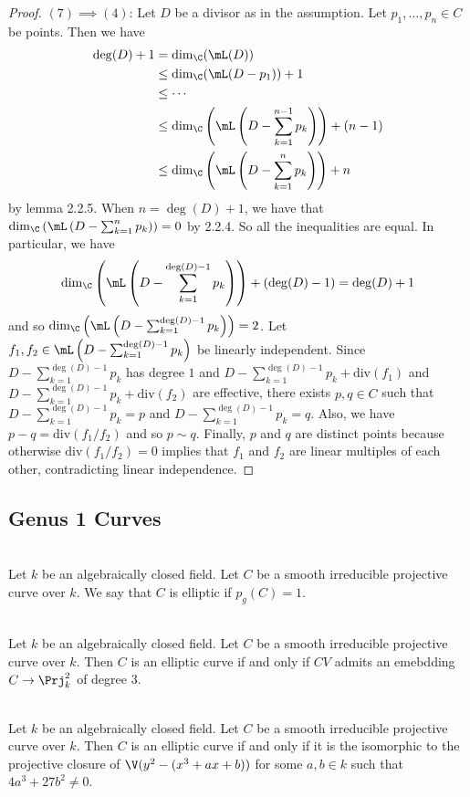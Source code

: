 \documentclass[a4paper]{article}
\begin{document}
\begin{prp}{}{}
\begin{proof}
$(7)\implies(4)$: Let $D$ be a divisor as in the assumption. Let $p_1,\dots,p_n\in C$ be points. Then we have 
\begin{align*}
\deg(D)+1&=\dim_\C(\mL(D))\\
&\leq\dim_\C(\mL(D-p_1))+1\\
&\leq\cdots\\
&\leq\dim_\C\left(\mL\left(D-\sum_{k=1}^{n-1}p_k\right)\right)+(n-1)\\
&\leq\dim_\C\left(\mL\left(D-\sum_{k=1}^np_k\right)\right)+n
\end{align*} by lemma 2.2.5. When $n=\deg(D)+1$, we have that $\dim_\C\left(\mL\left(D-\sum_{k=1}^np_k\right)\right)=0$ by 2.2.4. So all the inequalities are equal. In particular, we have $$\dim_\C\left(\mL\left(D-\sum_{k=1}^{\deg(D)-1}p_k\right)\right)+(\deg(D)-1)=\deg(D)+1$$ and so $\dim_\C\left(\mL\left(D-\sum_{k=1}^{\deg(D)-1}p_k\right)\right)=2$. Let $f_1,f_2\in\mL\left(D-\sum_{k=1}^{\deg(D)-1}p_k\right)$ be linearly independent. Since $D-\sum_{k=1}^{\deg(D)-1}p_k$ has degree $1$ and $D-\sum_{k=1}^{\deg(D)-1}p_k+\text{div}(f_1)$ and $D-\sum_{k=1}^{\deg(D)-1}p_k+\text{div}(f_2)$ are effective, there exists $p,q\in C$ such that $D-\sum_{k=1}^{\deg(D)-1}p_k=p$ and $D-\sum_{k=1}^{\deg(D)-1}p_k=q$. Also, we have $p-q=\text{div}(f_1/f_2)$ and so $p\sim q$. Finally, $p$ and $q$ are distinct points because otherwise $\text{div}(f_1/f_2)=0$ implies that $f_1$ and $f_2$ are linear multiples of each other, contradicting linear independence. 
\end{proof}
\end{prp}

\subsection{Genus 1 Curves}
\begin{defn}{}{}\\
Let $k$ be an algebraically closed field. Let $C$ be a smooth irreducible projective curve over $k$. We say that $C$ is elliptic if $p_g(C)=1$. 
\end{defn}

\begin{prp}{}{}\\
Let $k$ be an algebraically closed field. Let $C$ be a smooth irreducible projective curve over $k$. Then $C$ is an elliptic curve if and only if $CV$ admits an emebdding $C\to\Prj_k^2$ of degree $3$. 
\end{prp}

\begin{prp}{}{}\\
Let $k$ be an algebraically closed field. Let $C$ be a smooth irreducible projective curve over $k$. Then $C$ is an elliptic curve if and only if it is the isomorphic to the projective closure of $\V(y^2-(x^3+ax+b))$ for some $a,b\in k$ such that $4a^3+27b^2\neq 0$. 
\end{prp}
\end{document}
